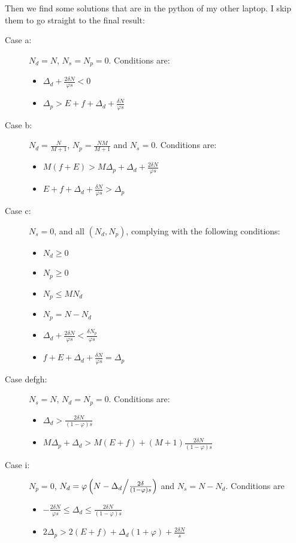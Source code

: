 \documentclass[english, a4paper]{article}
\theoremstyle{plain}
\theoremstyle{definition}
\theoremstyle{remark}
\begin{document}
Then we find some solutions that are in the python of my other laptop. I skip them to go straight to the final result:

\begin{description}
    \item [Case a:]\label{dis_case_a} $N_d = N$, $N_s = N_p = 0$. Conditions are:
    \begin{itemize}
        \item $\Delta_d + \frac{2\delta N}{\varphi s} < 0$
        \item $\Delta_p > E + f + \Delta_d + \frac{\delta N}{\varphi s}$
    \end{itemize}
    \item [Case b:]\label{dis_case_b} $N_d = \frac{N}{M + 1}$, $N_p = \frac{NM}{M+1}$ and $N_s = 0$. Conditions are:
    \begin{itemize}
        \item $M(f+E) > M\Delta_p + \Delta_d + \frac{2\delta N}{\varphi s}$
        \item $E + f + \Delta_d + \frac{\delta N}{\varphi s} > \Delta_p$
    \end{itemize}
    \item [Case c:]\label{dis_case_c} $N_s = 0$, and all $(N_d, N_p)$, complying with the following conditions:
    \begin{itemize}
        \item $N_d \geq 0$
        \item $N_p \geq 0$
        \item $N_p \leq MN_d$
        \item $N_p = N - N_d$
        \item $\Delta_d + \frac{2\delta N}{\varphi s} < \frac{\delta N_p}{\varphi s}$
        \item $f+E+\Delta_d + \frac{\delta N}{\varphi s} = \Delta_p$
    \end{itemize}

    \item [Case defgh:]\label{dis_case_defgh} $N_s = N$, $N_d = N_p = 0$. Conditions are:
    \begin{itemize}
        \item $\Delta_d > \frac{2\delta N}{(1 - \varphi )s}$
        \item $M \Delta_p + \Delta_d > M(E + f) + (M+1) \frac{2\delta N}{(1 - \varphi )s}$
    \end{itemize} %

    \item [Case i:] \label{dis_case_i} $N_p = 0$, $N_d = \varphi \left( N - \Delta_d \middle/ \frac{2\delta}{(1- \varphi) s} \right)$ and $N_s = N - N_d$. Conditions are
    \begin{itemize}
        \item $-\frac{2\delta N}{\varphi s} \leq \Delta_d \leq \frac{2\delta N}{(1-\varphi ) s}$
        \item $2\Delta_p > 2(E + f) + \Delta_d(1 + \varphi) + \frac{2 \delta N}{s}$
    \end{itemize}


\end{description}
\end{document}
